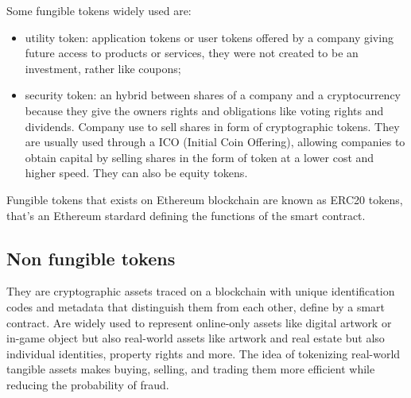Some fungible tokens widely used are:
\begin{itemize}
    \item utility token: application tokens or user tokens offered by a company giving future access to products or services, they were not created to be an investment, rather like coupons;

    \item security token: an hybrid between shares of a company and a cryptocurrency because they give the owners rights and obligations like voting rights and dividends.
    Company use to sell shares in form of cryptographic tokens.
    They are usually used through a ICO (Initial Coin Offering), allowing companies to obtain capital by selling shares in the form of token at a lower cost and higher speed.
    They can also be equity tokens.
\end{itemize}

Fungible tokens that exists on Ethereum blockchain are known as ERC20 tokens, that's an Ethereum stardard defining the functions of the smart contract.

\subsection{Non fungible tokens}
They are cryptographic assets traced on a blockchain with unique identification codes and metadata that distinguish them from each other, define by a smart contract.
Are widely used to represent online-only assets like digital artwork or in-game object but also real-world assets like artwork and real estate but also individual identities, property rights and more.
The idea of tokenizing real-world tangible assets makes buying, selling, and trading them more efficient while reducing the probability of fraud.

